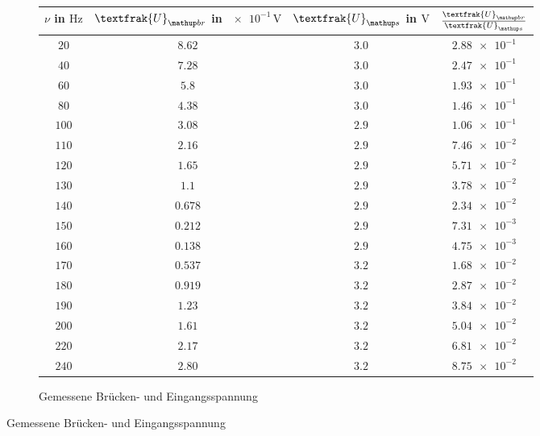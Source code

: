 \begin{figure}
\caption{Messwerte und Teilergebnise der  Wien-Robinson-Brücke}
\label{tab:mes_teil_wien}
\begin{subfigure}{0.49\textwidth}
\centering
\caption{Gemessene Brücken- und Eingangsspannung}
  \label{tab:U_br_u-s}
\begin{tabular}{S S S S}
    \toprule
    {$\nu$  in $\si{\hertz}$} &  {$\textfrak{U}\ua{br}$ in $\num{e-1}\,\si{\volt}$} & {$\textfrak{U}\ua{s}$  in $\si{\volt}$} & {$\frac{\textfrak{U}\ua{br}}{\textfrak{U}\ua{s}}$} \\
    \midrule
     {$\num{20}$} & {$\num{8.62}$} &  {$\num{3.0}$}& {$\num{2.88e-1}$}  \\
     {$\num{40}$} & {$\num{7.28}$}  & {$\num{3.0}$} & {$\num{2.47e-1}$} \\
     {$\num{60}$} & {$\num{5.8}$}  & {$\num{3.0}$} & {$\num{1.93e-1}$}  \\
     {$\num{80}$} & {$\num{4.38}$}  & {$\num{3.0}$} & {$\num{1.46e-1}$}  \\
     {$\num{100}$} & {$\num{3.08}$}  & {$\num{2.9}$} & {$\num{1.06e-1}$}  \\
     {$\num{110}$} & {$\num{2.16}$}  & {$\num{2.9}$} & {$\num{7.46e-2}$}  \\
     {$\num{120}$} & {$\num{1.65}$}  & {$\num{2.9}$} & {$\num{5.71e-2}$}  \\
     {$\num{130}$} & {$\num{1.1}$}  & {$\num{2.9}$} & {$\num{3.78e-2}$}  \\
     {$\num{140}$} & {$\num{0.678}$}  & {$\num{2.9}$} & {$\num{2.34e-2}$}  \\
     {$\num{150}$} & {$\num{0.212}$}  & {$\num{2.9}$} & {$\num{7.31e-3}$}  \\
     {$\num{160}$} & {$\num{0.138}$}  & {$\num{2.9}$} & {$\num{4.75e-3}$}  \\
     {$\num{170}$} & {$\num{0.537}$}  & {$\num{3.2}$} & {$\num{1.68e-2}$}  \\
     {$\num{180}$} & {$\num{0.919}$}  & {$\num{3.2}$} & {$\num{2.87e-2}$}  \\
     {$\num{190}$} & {$\num{1.23}$}  & {$\num{3.2}$} & {$\num{3.84e-2}$}  \\
     {$\num{200}$} & {$\num{1.61}$}  & {$\num{3.2}$} & {$\num{5.04e-2}$}  \\
     {$\num{220}$} & {$\num{2.17}$}  & {$\num{3.2}$} & {$\num{6.81e-2}$}  \\
     {$\num{240}$} & {$\num{2.80}$}  & {$\num{3.2}$} & {$\num{8.75e-2}$}  \\

\end{tabular}
\end{subfigure}
\end{figure}
